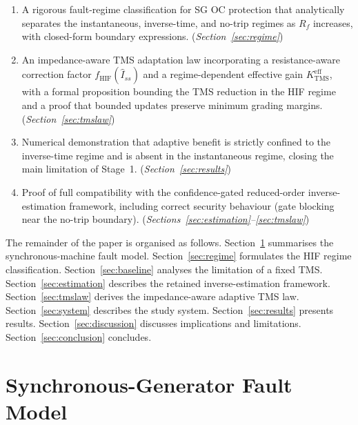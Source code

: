 \documentclass[10pt,journal,twoside]{IEEEtran}
\newcommand{\Rf}{R_{\!f}}
\newcommand{\Iss}{\hat{I}_{ss}}
\newcommand{\fhif}{f_{\mathrm{HIF}}}
\newcommand{\Keff}{K_{\mathrm{TMS}}^{\mathrm{eff}}}
\begin{document}
\begin{enumerate}
\item A rigorous fault-regime classification for SG OC protection that
      analytically separates the instantaneous, inverse-time, and no-trip
      regimes as $\Rf$ increases, with closed-form boundary expressions.
      (\textit{Section~\ref{sec:regime}})

\item An impedance-aware TMS adaptation law incorporating a resistance-aware
      correction factor $\fhif(\Iss)$ and a regime-dependent effective gain
      $\Keff$, with a formal proposition bounding the TMS reduction in the
      HIF regime and a proof that bounded updates preserve minimum grading margins.
      (\textit{Section~\ref{sec:tmslaw}})

\item Numerical demonstration that adaptive benefit is strictly confined to
      the inverse-time regime and is absent in the instantaneous regime,
      closing the main limitation of Stage~1.
      (\textit{Section~\ref{sec:results}})

\item Proof of full compatibility with the confidence-gated reduced-order
      inverse-estimation framework, including correct security behaviour
      (gate blocking near the no-trip boundary).
      (\textit{Sections~\ref{sec:estimation}--\ref{sec:tmslaw}})
\end{enumerate}

The remainder of the paper is organised as follows.
Section~\ref{sec:sgmodel} summarises the synchronous-machine fault model.
Section~\ref{sec:regime} formulates the HIF regime classification.
Section~\ref{sec:baseline} analyses the limitation of a fixed TMS.
Section~\ref{sec:estimation} describes the retained inverse-estimation framework.
Section~\ref{sec:tmslaw} derives the impedance-aware adaptive TMS law.
Section~\ref{sec:system} describes the study system.
Section~\ref{sec:results} presents results.
Section~\ref{sec:discussion} discusses implications and limitations.
Section~\ref{sec:conclusion} concludes.

\section{Synchronous-Generator Fault Model}
\label{sec:sgmodel}
\end{document}
